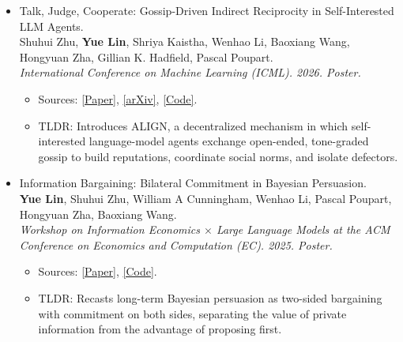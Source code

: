 \documentclass[a4paper,20pt]{article}
\begin{document}
\begin{itemize}[leftmargin=*,itemsep=0pt,topsep=0pt,partopsep=0pt]
\begin{itemize}[itemsep=0pt,topsep=0pt,partopsep=0pt]
        \item Sources:
            \href{https://arxiv.org/abs/2605.08323}{[arXiv]}.
        \item TLDR: Derives a pure-RL reciprocity gradient that solves cross-agent influence attribution by differentiating future returns through chains of actions, evaluations, and other agents' responses, so an agent learns from scratch both how to behave under social scrutiny and how to reshape group norms---without reward shaping, centralized mechanisms, or reputation priors.
      \end{itemize}
\item Talk, Judge, Cooperate: Gossip-Driven Indirect Reciprocity in Self-Interested LLM Agents. \\
      Shuhui Zhu, \textbf{Yue Lin}, Shriya Kaistha, Wenhao Li, Baoxiang Wang, Hongyuan Zha, Gillian K. Hadfield, Pascal Poupart. \\
      \textit{International Conference on Machine Learning (ICML). 2026. Poster.}
      \begin{itemize}[itemsep=0pt,topsep=0pt,partopsep=0pt]
      \item Sources:
                \href{https://openreview.net/forum?id=jYxRNCfRaD}{[Paper]},
                \href{https://arxiv.org/abs/2602.07777}{[arXiv]},
                \href{https://github.com/shuhui-zhu/ALIGN}{[Code]}.
            \item TLDR: Introduces ALIGN, a decentralized mechanism in which self-interested language-model agents exchange open-ended, tone-graded gossip to build reputations, coordinate social norms, and isolate defectors.
      \end{itemize}
\item Information Bargaining: Bilateral Commitment in Bayesian Persuasion. \\
      \textbf{Yue Lin}, Shuhui Zhu, William A Cunningham, Wenhao Li, Pascal Poupart, Hongyuan Zha, Baoxiang Wang. \\
      \textit{Workshop on Information Economics $\times$ Large Language Models at the ACM Conference on Economics and Computation (EC). 2025. Poster.}
      \begin{itemize}[itemsep=0pt,topsep=0pt,partopsep=0pt]
            \item Sources:
                \href{https://arxiv.org/abs/2506.05876}{[Paper]},
                \href{https://github.com/YueLin301/InformationBargaining}{[Code]}.
            \item TLDR: Recasts long-term Bayesian persuasion as two-sided bargaining with commitment on both sides, separating the value of private information from the advantage of proposing first.

\end{itemize}
\end{itemize}
\end{document}
